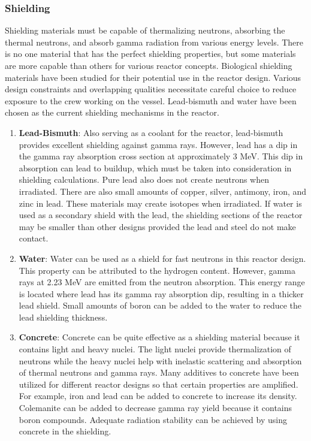 \documentclass[12pt]{article}
\begin{document}
\subsubsection{Shielding}
Shielding materials must be capable of thermalizing neutrons, absorbing the thermal neutrons, and absorb gamma radiation from various energy levels.  There is no one material that has the perfect shielding properties, but some materials are more capable than others for various reactor concepts.  Biological shielding materials have been studied for their potential use in the reactor design.  Various design constraints and overlapping qualities necessitate careful choice to reduce exposure to the crew working on the vessel.  Lead-bismuth and water have been chosen as the current shielding mechanisms in the reactor.  
\begin{enumerate}
\item \textbf{Lead-Bismuth}: \newline
Also serving as a coolant for the reactor, lead-bismuth provides excellent shielding against gamma rays.  However, lead has a dip in the gamma ray absorption cross section at approximately 3 MeV.  This dip in absorption can lead to buildup, which must be taken into consideration in shielding calculations.  Pure lead also does not create neutrons when irradiated.  There are also small amounts of copper, silver, antimony, iron, and zinc in lead.  These materials may create isotopes when irradiated.  If water is used as a secondary shield with the lead, the shielding sections of the reactor may be smaller than other designs provided the lead and steel do not make contact.  
\item \textbf{Water}: \newline
Water can be used as a shield for fast neutrons in this reactor design.  This property can be attributed to the hydrogen content.  However, gamma rays at 2.23 MeV are emitted from the neutron absorption.  This energy range is located where lead has its gamma ray absorption dip, resulting in a thicker lead shield.  Small amounts of boron can be added to the water to reduce the lead shielding thickness. 
\item \textbf{Concrete}: \newline
Concrete can be quite effective as a shielding material because it contains light and heavy nuclei.  The light nuclei provide thermalization of neutrons while the heavy nuclei help with inelastic scattering and absorption of thermal neutrons and gamma rays.  Many additives to concrete have been utilized for different reactor designs so that certain properties are amplified.  For example, iron and lead can be added to concrete to increase its density.  Colemanite can be added to decrease gamma ray yield because it contains boron compounds.  Adequate radiation stability can be achieved by using concrete in the shielding.  

\end{enumerate}
\end{document}
